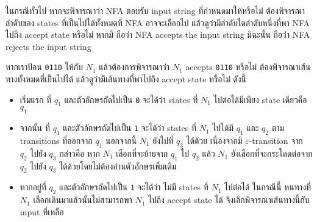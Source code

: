 \begin{example}
ในกรณีทั่วไป หากจะพิจารณาว่า NFA ตอบรับ input string ที่กำหนดมาให้หรือไม่ ต้องพิจารณาลำดับของ states ที่เป็นไปได้ทั้งหมดที่ NFA อาจจะเลือกไป แล้วดูว่ามีลำดับใดลำดับหนึ่งที่พา NFA ไปถึง accept state หรือไม่ \enskip หากมี ถือว่า NFA accepts the input string มิฉะนั้น ถือว่า NFA rejects the input string

หากเราป้อน \texttt{0110} ให้กับ $N_1$ แล้วต้องการพิจารณาว่า $N_1$ accepts \texttt{0110} หรือไม่ ต้องพิจารณาเส้นทางทั้งหมดที่เป็นไปได้ แล้วดูว่ามีเส้นทางที่พาไปถึง accept state หรือไม่ ดังนี้
\begin{center}
\end{center}
\begin{itemize}
\item เริ่มแรก ที่ $q_1$ และตัวอักษรถัดไปเป็น \texttt{0} จะได้ว่า states ที่ $N_1$ ไปต่อได้มีเพียง state เดียวคือ $q_1$
\item จากนั้น ที่ $q_1$ และตัวอักษรถัดไปเป็น \texttt{1} จะได้ว่า states ที่ $N_1$ ไปได้มี $q_1$ และ $q_2$ ตาม transitions ที่ออกจาก $q_1$ \enskip นอกจากนี้ $N_1$ ยังไปที่ $q_3$ ได้ด้วย เนื่องจากมี $\varepsilon$-transition จาก $q_2$ ไปยัง $q_3$ กล่าวคือ หาก $N_1$ เลือกที่จะย้ายจาก $q_1$ ไป $q_2$ แล้ว $N_1$ ยังเลือกที่จะกระโดดต่อจาก $q_2$ ไปยัง $q_3$ ได้ด้วยโดยไม่ต้องอ่านตัวอักษรเพิ่มเติม
\item หากอยู่ที่ $q_2$ และตัวอักษรถัดไปเป็น \texttt{1} จะได้ว่า ไม่มี states ที่ $N_1$ ไปต่อได้ \enskip ในกรณีนี้ หนทางที่ $N_1$ เลือกเดินมาแล้วนั้นไม่สามารถพา $N_1$ ไปถึง accept state ได้ จึงเลิกพิจารณาเส้นทางนี้กับ input ที่เหลือ

\end{itemize}
\end{example}
